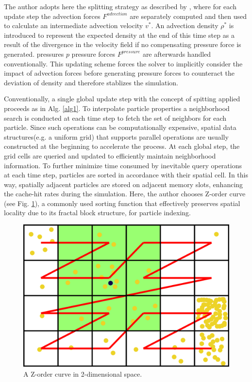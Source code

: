 \documentclass[
	11pt, 
	DIV10,
	ngerman,
	a4paper, 
	oneside, 
	headings=normal, 
	captions=tableheading,
	final, 
	numbers=noenddot
]{scrartcl}
\begin{document}
The author adopts here the splitting strategy as described by \cite{ihmsen2014sph}, where for each update step the advection forces $ F^{advection} $ are separately computed and then used to calculate an intermediate advection velocity $ v^{*} $. An advection density $ \rho^{*} $ is introduced to represent the expected density at the end of this time step as a result of the divergence in the velocity field if no compensating pressure force is generated. pressures $ p $ pressure forces $ F^{pressure} $ are afterwards handled conventionally. This updating scheme forces the solver to implicitly consider the impact of advection forces before generating pressure forces to counteract the deviation of density and therefore stablizes the simulation.
\par
Conventionally, a single global update step with the concept of spitting applied proceeds as in Alg. \ref{alg1}. To interpolate particle properties a neighborhood search is conducted at each time step to fetch the set of neighbors for each particle. Since such operations can be computationally expensive, spatial data
structures(e.g. a uniform grid) that supports parallel operations are usually constructed at the beginning to accelerate the process. At each global step, the grid cells are queried and updated to efficiently maintain neighborhood information. To further minimize time consumed by inevitable query operations at each time step, particles are sorted in accordance with their spatial cell. In this way, spatially adjacent particles are stored on adjacent memory slots, enhancing the cache-hit rates during the simulation. Here, the author chooses Z-order curve (see Fig. \ref{fig6}), a commonly used sorting function that effectively preserves spatial locality due to its fractal block structure, for particle indexing.

\begin{figure}[tb]
	\centering
	\includegraphics[scale=0.06]{images/7}
	\caption{\label{fig6} A Z-order curve in 2-dimensional space.}
\end{figure}
\end{document}
